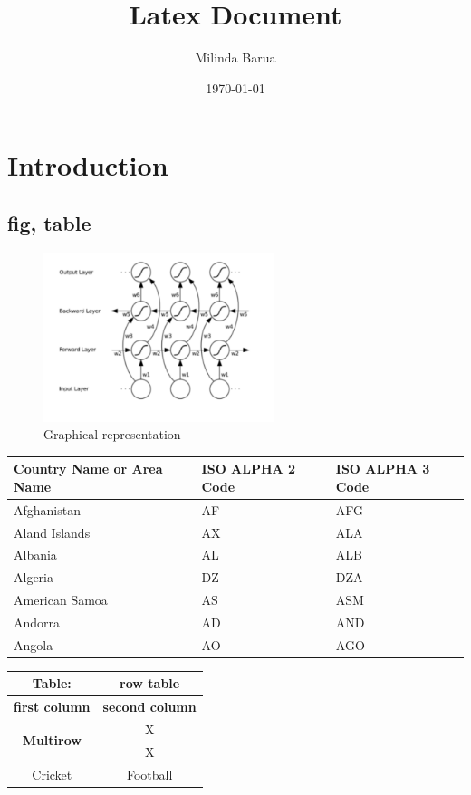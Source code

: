 \documentclass{artisubssubssubssubssubscle}
\title{Latex Document}
\author{Milinda Barua}
\date{\today}
\begin{document}
\maketitle

\section{Introduction}
\subsection{fig, table}
\begin{figure}[h]
    \centering
    \includegraphics[width=0.6\textwidth]{./assets/image1.png}
    \caption{Graphical representation}
    \label{fig:graphical_representation}
\end{figure}


\begin{table}[h!]
    \centering
\begin{tabular}{ |p{3cm}|p{3cm}|p{3cm}|  }
 \hline
 Country Name or Area Name& ISO ALPHA 2 Code &ISO ALPHA 3 Code\\
 \hline
 Afghanistan & AF & AFG\\
 Aland Islands & AX & ALA\\
 \hline
 Albania & AL & ALB\\
 Algeria & DZ & DZA\\
 American Samoa & AS & ASM\\
 Andorra & AD & AND\\
 Angola & AO & AGO\\
 \hline
    \end{tabular}
    \label{tab:my_label}
\end{table}

\begin{table}[h!]
    \centering
    \begin{tabular}{c c}
        Table: &row table\\
        \hline
        \textbf{first column} & \textbf{second column} \\
        \multirow{2}{*}{\textbf{Multirow}} & X \\
        & X \\
        Cricket & Football \\
        \hline
    \end{tabular}
\end{table}
\end{document}
